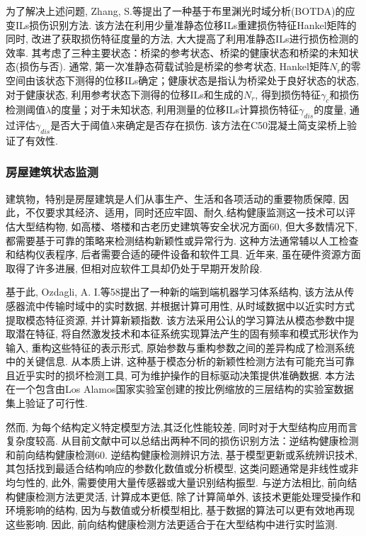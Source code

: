 \documentclass{Style/aas}
\begin{document}
\begin{multicols}{2}
  为了解决上述问题, Zhang, S.等\cite{zhang2019damage}提出了一种基于布里渊光时域分析(BOTDA)的应变ILs损伤识别方法. 该方法在利用少量准静态位移ILs重建损伤特征Hankel矩阵的同时, 改进了获取损伤特征度量的方法, 大大提高了利用准静态ILs进行损伤检测的效率. 其考虑了三种主要状态：桥梁的参考状态、桥梁的健康状态和桥梁的未知状态(损伤与否). 通常, 第一次准静态荷载试验是桥梁的参考状态, Hankel矩阵$N_r  $的零空间由该状态下测得的位移ILs确定；健康状态是指认为桥梁处于良好状态的状态, 对于健康状态, 利用参考状态下测得的位移ILs和生成的$N_r  $, 得到损伤特征$  \gamma _c$和损伤检测阈值$λ$的度量；对于未知状态, 利用测量的位移ILs计算损伤特征$\gamma _{dis} $的度量, 通过评估$\gamma _{dis} $是否大于阈值$λ$来确定是否存在损伤. 该方法在C50混凝土简支梁桥上验证了有效性.


  \subsubsection{房屋建筑状态监测}
  建筑物，特别是房屋建筑是人们从事生产、生活和各项活动的重要物质保障, 因此，不仅要求其经济、适用，同时还应牢固、耐久.结构健康监测这一技术可以评估大型结构物, 如高楼、塔楼和古老历史建筑等安全状况方面60, 但大多数情况下, 都需要基于可靠的策略来检测结构新颖性或异常行为. 这种方法通常辅以人工检查和结构仪表程序, 后者需要合适的硬件设备和软件工具. 近年来, 虽在硬件资源方面取得了许多进展, 但相对应软件工具却仍处于早期开发阶段.

  基于此,  Ozdagli, A. I.等58提出了一种新的端到端机器学习体系结构, 该方法从传感器流中传输时域中的实时数据, 并根据计算可用性, 从时域数据中以近实时方式提取模态特征资源, 并计算新颖指数. 该方法采用公认的学习算法从模态参数中提取潜在特征, 将自然激发技术和本征系统实现算法产生的固有频率和模式形状作为输入, 重构这些特征的表示形式, 原始参数与重构参数之间的差异构成了检测系统中的关键信息. 从本质上讲, 这种基于模态分析的新颖性检测方法有可能充当可靠且近乎实时的损坏检测工具, 可为维护操作的目标驱动决策提供准确数据. 本方法在一个包含由Los Alamos国家实验室创建的按比例缩放的三层结构的实验室数据集上验证了可行性.

  然而, 为每个结构定义特定模型方法,其泛化性能较差, 同时对于大型结构应用而言复杂度较高. 从目前文献中可以总结出两种不同的损伤识别方法：逆结构健康检测和前向结构健康检测60. 逆结构健康检测辨识方法, 基于模型更新或系统辨识技术, 其包括找到最适合结构响应的参数化数值或分析模型, 这类问题通常是非线性或非均匀性的, 此外, 需要使用大量传感器或大量识别结构振型. 与逆方法相比, 前向结构健康检测方法更灵活, 计算成本更低, 除了计算简单外, 该技术更能处理受操作和环境影响的结构, 因为与数值或分析模型相比, 基于数据的算法可以更有效地再现这些影响. 因此, 前向结构健康检测方法更适合于在大型结构中进行实时监测.


\end{multicols}
\end{document}
